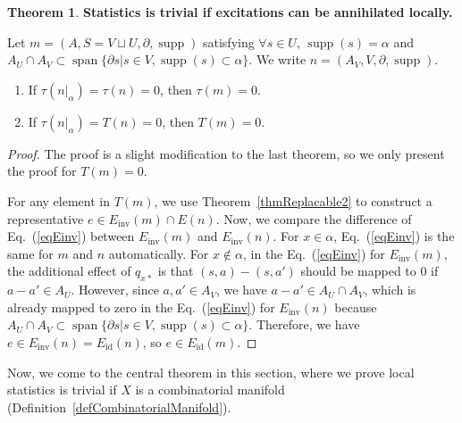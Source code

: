 \documentclass[reprint, amsmath, amssymb, showpacs, floatfix, longbibliography, aps, twocolumn, superscriptaddress, nofootinbib]{revtex4-2}
\newcommand{\supp}{\operatorname{supp}}
\theoremstyle{definition}
\newtheorem{theorem}{Theorem}[section]
\begin{document}
\begin{theorem}\label{thmTrivialStatisticsInduction}
	\textbf{Statistics is trivial if excitations can be annihilated locally.}
	
	Let $m=(A,S=V\sqcup U,\partial,\supp)$ satisfying $\forall s\in U$, $\supp(s)=\alpha$ and $A_U\cap A_V\subset \operatorname{span}\{\partial s|s\in V,\supp(s)\subset \alpha\}$. We write $n=(A_V,V,\partial,\supp)$.
	\begin{enumerate}
		\item If $\tau(n|_\alpha)=\tau(n)=0$, then $\tau(m)=0$.
		\item If $\tau(n|_\alpha)=T(n)=0$, then $T(m)=0$.
	\end{enumerate}
\end{theorem}
\begin{proof}
	The proof is a slight modification to the last theorem, so we only present the proof for $T(m)=0$.
	
	For any element in $T(m)$, we use Theorem~\ref{thmReplacable2} to construct a representative $e\in E_{\operatorname{inv}}(m)\cap E(n)$. Now, we compare the difference of Eq.~(\ref{eqEinv}) between $E_{\operatorname{inv}}(m)$ and $E_{\operatorname{inv}}(n)$. For $x\in \alpha$, Eq.~(\ref{eqEinv}) is the same for $m$ and $n$ automatically. For $x\notin \alpha$, in the Eq.~(\ref{eqEinv}) for $E_{\operatorname{inv}}(m)$, the additional effect of $q_{x*}$ is that $(s,a)-(s,a')$ should be mapped to $0$ if $a-a'\in A_U$. However, since $a,a'\in A_V$, we have $a-a'\in A_U\cap A_V$, which is already mapped to zero in the Eq.~(\ref{eqEinv}) for $E_{\operatorname{inv}}(n)$ because $A_U\cap A_V\subset \operatorname{span}\{\partial s|s\in V,\supp(s)\subset \alpha\}$. Therefore, we have $e\in E_{\operatorname{inv}}(n)=E_{\operatorname{id}}(n)$, so $e\in E_{\operatorname{id}}(m)$.
\end{proof}



Now, we come to the central theorem in this section, where we prove local statistics is trivial if $X$ is a combinatorial manifold (Definition~\ref{defCombinatorialManifold}).
\end{document}
